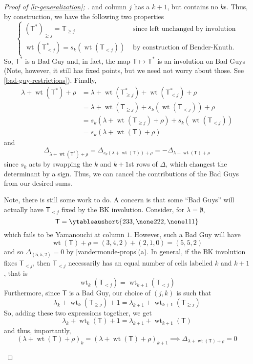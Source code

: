 \documentclass[11pt,leqno,oneside]{amsart}
\numberwithin{thm}{section}
\newcommand{\T}{\mathsf{T}} %
\newcommand{\Vdet}{\Delta}
\newcommand{\rowshift}{\rho}
\newcommand{\wt}{\operatorname{wt}}
\begin{document}
\begin{proof}[Proof of \ref{lr-generalization}; \cite{stembridge}]
  and column \(j\) has a \(k+1\), but contains no \(k\)s. Thus, by
  construction, we have the following two properties \[
    \begin{cases}
      (\T^*)_{\geq j} = \T_{\geq j} & \text{ since left unchanged by
        involution}\\
      \wt(\T^*_{< j}) = s_k(\wt(\T_{< j})) & \text{ by construction of
      Bender-Knuth.}
    \end{cases}
  \]
  So, \(\T^*\) is a Bad Guy and, in fact, the map \(\T \mapsto \T^*\)
  is an involution on Bad Guys (Note, however, it still has fixed
  points, but we need not worry about those. See
  \ref{bad-guy-restrictions}). Finally, 
  \begin{align*}
    \lambda+\wt(\T^*) + \rowshift
    & = \lambda + \wt(\T^*_{\geq j}) + \wt(\T^*_{<j}) + \rowshift\\
    & = \lambda + \wt(\T_{\geq j}) + s_k(\wt(\T_{<j})) + \rowshift\\
    & = s_k(\lambda+\wt(\T_{\geq j})+\rowshift) + s_k(\wt(\T_{<j}))\\
    & = s_k(\lambda+\wt(\T)+\rowshift)
  \end{align*}
  and \[
    \Vdet_{\lambda+\wt(\T^*)+\rowshift} =
    \Vdet_{s_k(\lambda+\wt(\T))+\rowshift} = 
    -\Vdet_{\lambda+\wt(\T)+\rowshift} 
  \]
  since \(s_k\) acts by swapping the \(k\) and \(k+1\)st rows of
  \(\Vdet\), which changest the determinant by a sign. Thus, we can
  cancel the contributions of the Bad Guys from our desired sums.
  \begin{rmk}\label{bad-guy-restrictions}
    Note, there is still some work to do. A concern is that some
    ``Bad Guys'' will actually have \(\T_{<j}\) fixed by the BK
    involution. Consider, for \(\lambda = \emptyset\), \[
      \T = \ytableaushort{233,\none222,\none111}
    \]
    which fails to be Yamanouchi at column \(1\). However, such a Bad
    Guy will have \[
      \wt(\T)+\rowshift = (3,4,2)+(2,1,0) = (5,5,2)
    \]
    and so \(\Vdet_{(5,5,2)} = 0\) by
    \ref{vandermonde-props}(a). In general, if the BK involution fixes
    \(\T_{<j}\), then \(\T_{<j}\) necessarily has an
    equal number of cells labelled \(k\) and \(k+1\), that is\[
      \wt_k(\T_{<j}) = \wt_{k+1}(\T_{<j})
    \]
    Furthermore, since
    \(\T\) is a Bad Guy, our choice of \((j,k)\) is such that \[
      \lambda_k+\wt_k(\T_{\geq j}) + 1 = \lambda_{k+1} + \wt_{k+1}(\T_{\geq j})
    \]
    So, adding these two expressions together, we get \[
      \lambda_k+\wt_k(\T)+1 = \lambda_{k+1}+\wt_{k+1}(\T)
    \]
    and thus, importantly, \[
      (\lambda+\wt(\T)+\rowshift)_k =
      (\lambda+\wt(\T)+\rowshift)_{k+1} \implies
      \Vdet_{\lambda+\wt(\T)+\rowshift} = 0
    \]
  \end{rmk}
\end{proof}
\end{document}

